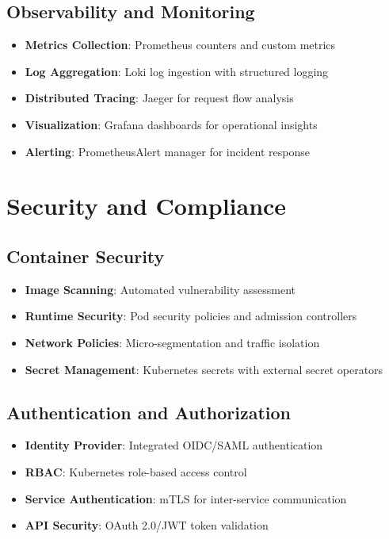 \documentclass[12pt]{report}
\begin{document}
\subsection{Observability and Monitoring}
\begin{itemize}
  \item \textbf{Metrics Collection}: Prometheus counters and custom metrics
  \item \textbf{Log Aggregation}: Loki log ingestion with structured logging
  \item \textbf{Distributed Tracing}: Jaeger for request flow analysis
  \item \textbf{Visualization}: Grafana dashboards for operational insights
  \item \textbf{Alerting}: PrometheusAlert manager for incident response
\end{itemize}

\section{Security and Compliance}

\subsection{Container Security}
\begin{itemize}
  \item \textbf{Image Scanning}: Automated vulnerability assessment
  \item \textbf{Runtime Security}: Pod security policies and admission controllers
  \item \textbf{Network Policies}: Micro-segmentation and traffic isolation
  \item \textbf{Secret Management}: Kubernetes secrets with external secret operators
\end{itemize}

\subsection{Authentication and Authorization}
\begin{itemize}
  \item \textbf{Identity Provider}: Integrated OIDC/SAML authentication
  \item \textbf{RBAC}: Kubernetes role-based access control
  \item \textbf{Service Authentication}: mTLS for inter-service communication
  \item \textbf{API Security}: OAuth 2.0/JWT token validation
\end{itemize}
\end{document}
